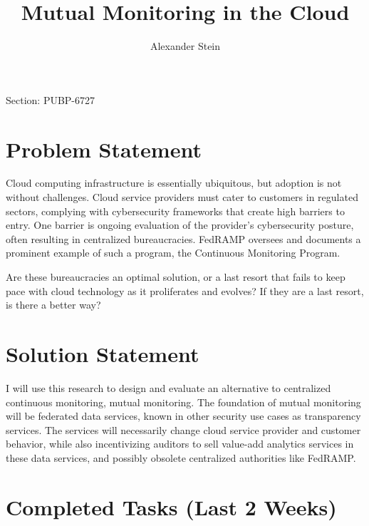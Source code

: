 \documentclass{jdf}
\begin{document}
Section: PUBP-6727
\title{Mutual Monitoring in the Cloud}
\author{Alexander Stein}

\maketitle
\thispagestyle{fancy}


\section*{Problem Statement}

Cloud computing infrastructure is essentially ubiquitous, but adoption is not without challenges. Cloud service providers must cater to customers in regulated sectors, complying with cybersecurity frameworks that create high barriers to entry. One barrier is ongoing evaluation of the provider's cybersecurity posture, often resulting in centralized bureaucracies. FedRAMP oversees and documents a prominent example of such a program, the Continuous Monitoring Program.

Are these bureaucracies an optimal solution, or a last resort that fails to keep pace with cloud technology as it proliferates and evolves? If they are a last resort, is there a better way?

\section*{Solution Statement}

I will use this research to design and evaluate an alternative to centralized continuous monitoring, mutual monitoring. The foundation of mutual monitoring will be federated data services, known in other security use cases as transparency services. The services will necessarily change cloud service provider and customer behavior, while also incentivizing auditors to sell value-add analytics services in these data services, and possibly obsolete centralized authorities like FedRAMP.

\section*{Completed Tasks (Last 2 Weeks)}
\end{document}
